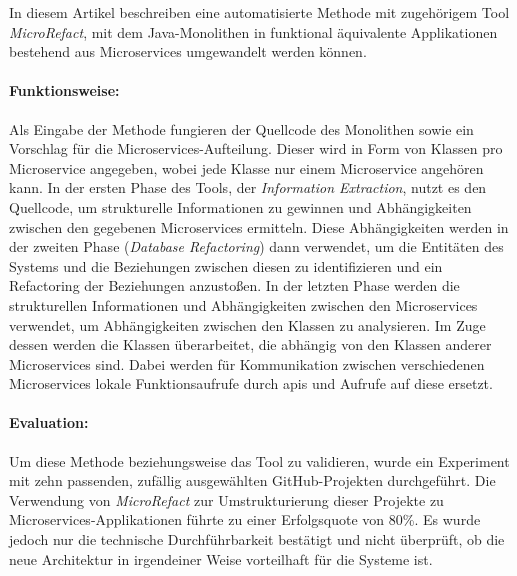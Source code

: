 In diesem Artikel beschreiben \citeauthor{arh-result-no-filter-4} eine automatisierte Methode mit zugehörigem Tool \emph{MicroRefact}, mit dem Java-Monolithen in funktional äquivalente Applikationen bestehend aus Microservices umgewandelt werden können.
\paragraph{Funktionsweise:} Als Eingabe der Methode fungieren der Quellcode des Monolithen sowie ein Vorschlag für die Microservices-Aufteilung. Dieser wird in Form von Klassen pro Microservice angegeben, wobei jede Klasse nur einem Microservice angehören kann.
In der ersten Phase des Tools, der \emph{Information Extraction}, nutzt es den Quellcode, um strukturelle Informationen zu gewinnen und Abhängigkeiten zwischen den gegebenen Microservices ermitteln.
Diese Abhängigkeiten werden in der zweiten Phase (\emph{Database Refactoring}) dann verwendet, um die Entitäten des Systems und die Beziehungen zwischen diesen zu identifizieren und ein Refactoring der Beziehungen anzustoßen.
In der letzten Phase werden die strukturellen Informationen und Abhängigkeiten zwischen den Microservices verwendet, um Abhängigkeiten zwischen den Klassen zu analysieren.
Im Zuge dessen werden die Klassen überarbeitet, die abhängig von den Klassen anderer Microservices sind.
Dabei werden für Kommunikation zwischen verschiedenen Microservices lokale Funktionsaufrufe durch \glspl{api} und Aufrufe auf diese ersetzt.

\paragraph{Evaluation:} Um diese Methode beziehungsweise das Tool zu validieren, wurde ein Experiment mit zehn passenden, zufällig ausgewählten GitHub-Projekten durchgeführt.
Die Verwendung von \emph{MicroRefact} zur Umstrukturierung dieser Projekte zu Microservices-Applikationen führte zu einer Erfolgsquote von 80\%.
Es wurde jedoch nur die technische Durchführbarkeit bestätigt und nicht überprüft, ob die neue Architektur in irgendeiner Weise vorteilhaft für die Systeme ist.

%

